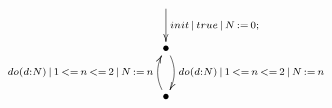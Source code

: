 $\xymatrix{
   \ar[d]^{init\,|\,true\,|\,N\,:=\,0;} \\
   \bullet \ar@/^/[d]^{do(d:N)\,|\,1\,<=\,n\,<=\,2\,|\,N\,:=\,n} \\
   \bullet \ar@/^/[u]^{do(d:N)\,|\,1\,<=\,n\,<=\,2\,|\,N\,:=\,n}}$
